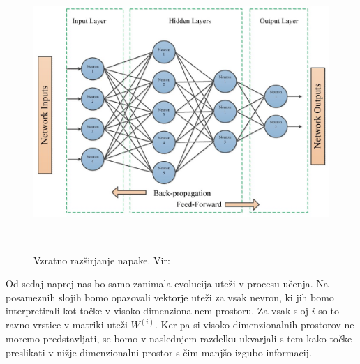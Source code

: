 \begin{figure}[H]
  \centering
  \includegraphics[width=0.7\linewidth]{resources/backpropagation.jpeg}
  \caption{Vzratno razširjanje napake. Vir:~\cite{electronics10212689}}~\label{fig:backprop}
\end{figure}

Od sedaj naprej nas bo samo zanimala evolucija uteži v procesu učenja. Na posameznih slojih bomo opazovali vektorje uteži za vsak nevron, ki jih bomo interpretirali kot točke v visoko dimenzionalnem prostoru. Za vsak sloj $i$ so to  ravno vrstice v matriki uteži $W^{(i)}$. Ker pa si visoko dimenzionalnih prostorov ne moremo predstavljati, se bomo v naslednjem razdelku ukvarjali s tem kako točke preslikati v nižje dimenzionalni prostor s čim manjšo izgubo informacij.
